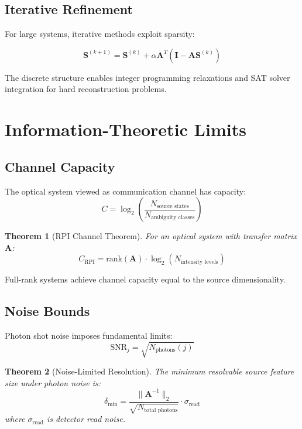 \documentclass[twocolumn,10pt,a4paper]{article}
\newtheorem{theorem}{Theorem}[section]
\begin{document}
\subsection{Iterative Refinement}

For large systems, iterative methods exploit sparsity:

\begin{equation}
\mathbf{S}^{(k+1)} = \mathbf{S}^{(k)} + \alpha \mathbf{A}^T (\mathbf{I} - \mathbf{A}\mathbf{S}^{(k)})
\end{equation}

The discrete structure enables integer programming relaxations and SAT solver integration for hard reconstruction problems.

\section{Information-Theoretic Limits}

\subsection{Channel Capacity}

The optical system viewed as communication channel has capacity:
\begin{equation}
C = \log_2 \left(\frac{N_{\text{source states}}}{N_{\text{ambiguity classes}}}\right)
\end{equation}

\begin{theorem}[RPI Channel Theorem]
For an optical system with transfer matrix $\mathbf{A}$:
\begin{equation}
C_{\text{RPI}} = \text{rank}(\mathbf{A}) \cdot \log_2(N_{\text{intensity levels}})
\end{equation}
\end{theorem}

Full-rank systems achieve channel capacity equal to the source dimensionality.

\subsection{Noise Bounds}

Photon shot noise imposes fundamental limits:
\begin{equation}
\text{SNR}_j = \sqrt{N_{\text{photons}}(j)}
\end{equation}

\begin{theorem}[Noise-Limited Resolution]
The minimum resolvable source feature size under photon noise is:
\begin{equation}
\delta_{\min} = \frac{\|\mathbf{A}^{-1}\|_2}{\sqrt{N_{\text{total photons}}}} \cdot \sigma_{\text{read}}
\end{equation}
where $\sigma_{\text{read}}$ is detector read noise.
\end{theorem}
\end{document}
